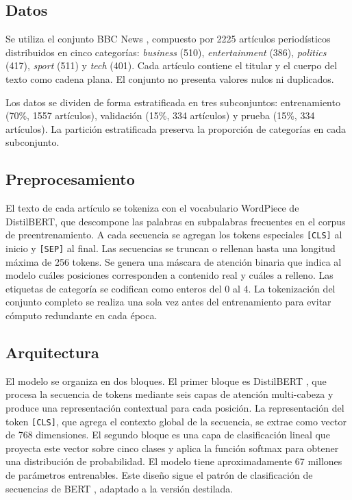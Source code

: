\documentclass[letterpaper, 10 pt, conference]{latex_template/ieeeconf}
\begin{document}
\subsection{Datos}

Se utiliza el conjunto BBC News \cite{c4}, compuesto por 2225 artículos periodísticos distribuidos en cinco categorías: \textit{business} (510), \textit{entertainment} (386), \textit{politics} (417), \textit{sport} (511) y \textit{tech} (401). Cada artículo contiene el titular y el cuerpo del texto como cadena plana. El conjunto no presenta valores nulos ni duplicados.

Los datos se dividen de forma estratificada en tres subconjuntos: entrenamiento (70\%, 1557 artículos), validación (15\%, 334 artículos) y prueba (15\%, 334 artículos). La partición estratificada preserva la proporción de categorías en cada subconjunto.

\subsection{Preprocesamiento}

El texto de cada artículo se tokeniza con el vocabulario WordPiece de DistilBERT, que descompone las palabras en subpalabras frecuentes en el corpus de preentrenamiento. A cada secuencia se agregan los tokens especiales \texttt{[CLS]} al inicio y \texttt{[SEP]} al final. Las secuencias se truncan o rellenan hasta una longitud máxima de 256 tokens. Se genera una máscara de atención binaria que indica al modelo cuáles posiciones corresponden a contenido real y cuáles a relleno. Las etiquetas de categoría se codifican como enteros del 0 al 4. La tokenización del conjunto completo se realiza una sola vez antes del entrenamiento para evitar cómputo redundante en cada época.

\subsection{Arquitectura}

El modelo se organiza en dos bloques. El primer bloque es DistilBERT \cite{c3}, que procesa la secuencia de tokens mediante seis capas de atención multi-cabeza y produce una representación contextual para cada posición. La representación del token \texttt{[CLS]}, que agrega el contexto global de la secuencia, se extrae como vector de 768 dimensiones. El segundo bloque es una capa de clasificación lineal que proyecta este vector sobre cinco clases y aplica la función softmax para obtener una distribución de probabilidad. El modelo tiene aproximadamente 67 millones de parámetros entrenables. Este diseño sigue el patrón de clasificación de secuencias de BERT \cite{c2}, adaptado a la versión destilada.
\end{document}
